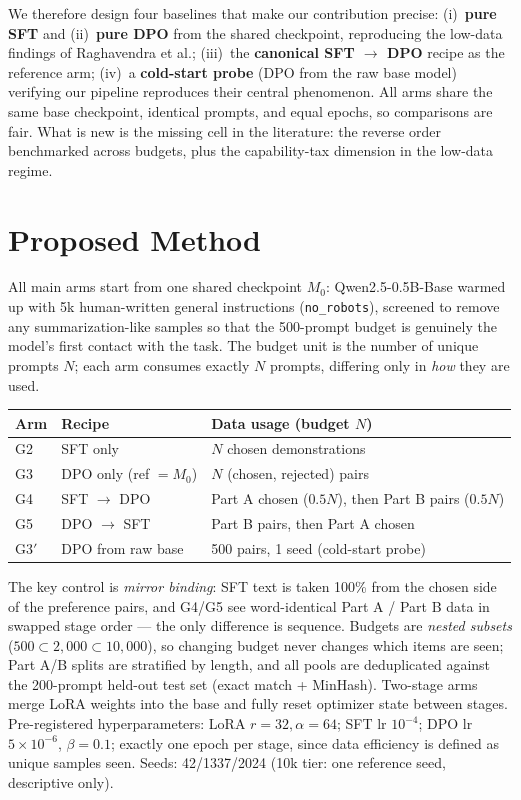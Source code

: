 \documentclass[11pt]{article}
\begin{document}
We therefore design four baselines that make our contribution precise: (i)~\textbf{pure SFT} and (ii)~\textbf{pure DPO} from the shared checkpoint, reproducing the low-data findings of Raghavendra et al.; (iii)~the \textbf{canonical SFT $\rightarrow$ DPO} recipe as the reference arm; (iv)~a \textbf{cold-start probe} (DPO from the raw base model) verifying our pipeline reproduces their central phenomenon. All arms share the same base checkpoint, identical prompts, and equal epochs, so comparisons are fair. What is new is the missing cell in the literature: the reverse order benchmarked across budgets, plus the capability-tax dimension in the low-data regime.

\section{Proposed Method}

All main arms start from one shared checkpoint $M_0$: Qwen2.5-0.5B-Base warmed up with 5k human-written general instructions (\texttt{no\_robots}), screened to remove any summarization-like samples so that the 500-prompt budget is genuinely the model's first contact with the task. The budget unit is the number of unique prompts $N$; each arm consumes exactly $N$ prompts, differing only in \emph{how} they are used.

\begin{center}
\begin{tabularx}{\linewidth}{@{}l l X@{}}
\toprule
\textbf{Arm} & \textbf{Recipe} & \textbf{Data usage (budget $N$)} \\
\midrule
G2 & SFT only & $N$ chosen demonstrations \\
G3 & DPO only (ref $=M_0$) & $N$ (chosen, rejected) pairs \\
G4 & SFT $\rightarrow$ DPO & Part A chosen ($0.5N$), then Part B pairs ($0.5N$) \\
G5 & DPO $\rightarrow$ SFT & Part B pairs, then Part A chosen \\
G3$'$ & DPO from raw base & 500 pairs, 1 seed (cold-start probe) \\
\bottomrule
\end{tabularx}
\end{center}

The key control is \emph{mirror binding}: SFT text is taken 100\% from the chosen side of the preference pairs, and G4/G5 see word-identical Part A / Part B data in swapped stage order --- the only difference is sequence. Budgets are \emph{nested subsets} ($500\subset2{,}000\subset10{,}000$), so changing budget never changes which items are seen; Part A/B splits are stratified by length, and all pools are deduplicated against the 200-prompt held-out test set (exact match + MinHash). Two-stage arms merge LoRA weights into the base and fully reset optimizer state between stages. Pre-registered hyperparameters: LoRA $r{=}32,\alpha{=}64$; SFT lr $10^{-4}$; DPO lr $5{\times}10^{-6}$, $\beta{=}0.1$; exactly one epoch per stage, since data efficiency is defined as unique samples seen. Seeds: 42/1337/2024 (10k tier: one reference seed, descriptive only).
\end{document}
